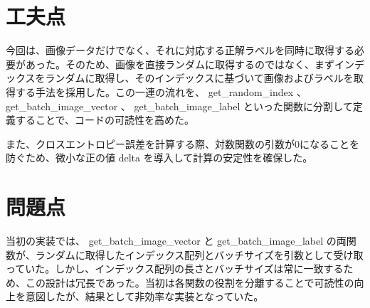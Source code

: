 \documentclass[11px,a4paper]{jsarticle}
\begin{document}
\section{工夫点}
今回は、画像データだけでなく、それに対応する正解ラベルを同時に取得する必要があった。そのため、画像を直接ランダムに取得するのではなく、まずインデックスをランダムに取得し、そのインデックスに基づいて画像およびラベルを取得する手法を採用した。この一連の流れを、 get\_random\_index 、 get\_batch\_image\_vector 、 get\_batch\_image\_label といった関数に分割して定義することで、コードの可読性を高めた。

また、クロスエントロピー誤差を計算する際、対数関数の引数が0になることを防ぐため、微小な正の値 delta を導入して計算の安定性を確保した。

\section{問題点}
当初の実装では、 get\_batch\_image\_vector と get\_batch\_image\_label の両関数が、ランダムに取得したインデックス配列とバッチサイズを引数として受け取っていた。しかし、インデックス配列の長さとバッチサイズは常に一致するため、この設計は冗長であった。当初は各関数の役割を分離することで可読性の向上を意図したが、結果として非効率な実装となっていた。
\end{document}
